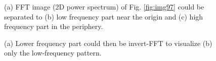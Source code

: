 \begin{figure}[htbp]
 \centering
 \caption{ (a) FFT image (2D power spectrum) of Fig. \ref{fig:img97} could be separated to (b) low frequency part near the origin and (c) high frequency part in the periphery.}
 \label{fig:2DpowerSeparation}
\end{figure} 


\begin{figure}[htbp]
 \centering
 \caption{ (a) Lower frequency part could then be invert-FFT to visualize (b) only the low-frequency pattern.}
 \label{fig:invertToGetLowFrequencyImage}
\end{figure} 

